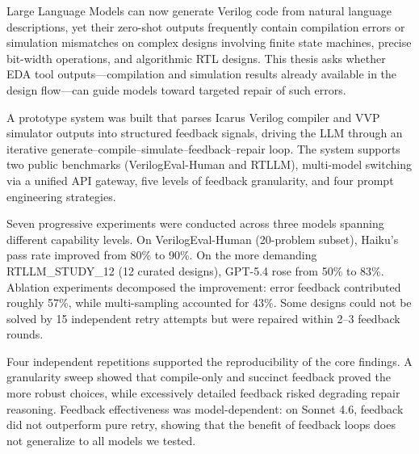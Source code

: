 \begin{eabstract}
Large Language Models can now generate Verilog code from natural language descriptions, yet their zero-shot outputs frequently contain compilation errors or simulation mismatches on complex designs involving finite state machines, precise bit-width operations, and algorithmic RTL designs.  This thesis asks whether EDA tool outputs---compilation and simulation results already available in the design flow---can guide models toward targeted repair of such errors.

A prototype system was built that parses Icarus Verilog compiler and VVP simulator outputs into structured feedback signals, driving the LLM through an iterative generate--compile--simulate--feedback--repair loop.  The system supports two public benchmarks (VerilogEval-Human and RTLLM), multi-model switching via a unified API gateway, five levels of feedback granularity, and four prompt engineering strategies.

Seven progressive experiments were conducted across three models spanning different capability levels.  On VerilogEval-Human (20-problem subset), Haiku's pass rate improved from 80\% to 90\%.  On the more demanding RTLLM\_STUDY\_12 (12 curated designs), GPT-5.4 rose from 50\% to 83\%.  Ablation experiments decomposed the improvement: error feedback contributed roughly 57\%, while multi-sampling accounted for 43\%.  Some designs could not be solved by 15 independent retry attempts but were repaired within 2--3 feedback rounds.

Four independent repetitions supported the reproducibility of the core findings.  A granularity sweep showed that compile-only and succinct feedback proved the more robust choices, while excessively detailed feedback risked degrading repair reasoning.  Feedback effectiveness was model-dependent: on Sonnet 4.6, feedback did not outperform pure retry, showing that the benefit of feedback loops does not generalize to all models we tested.
\end{eabstract}
